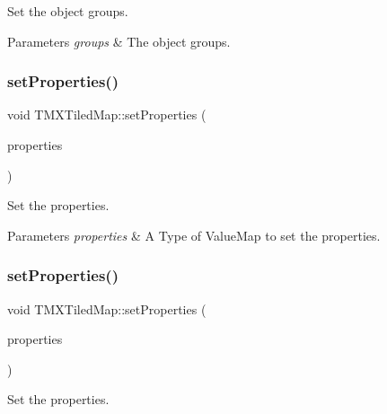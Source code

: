 Set the object groups.


\begin{DoxyParams}{Parameters}
{\em groups} & The object groups. \\
\hline
\end{DoxyParams}
\mbox{\label{classTMXTiledMap_a818366d2f1093dfd8afc24126ffbac36}} 
\subsubsection{\texorpdfstring{set\+Properties()}{setProperties()}\hspace{0.1cm}{\footnotesize\ttfamily [1/2]}}
{\footnotesize\ttfamily void T\+M\+X\+Tiled\+Map\+::set\+Properties (\begin{DoxyParamCaption}\item[{const Value\+Map \&}]{properties }\end{DoxyParamCaption})\hspace{0.3cm}{\ttfamily [inline]}}

Set the properties.


\begin{DoxyParams}{Parameters}
{\em properties} & A Type of Value\+Map to set the properties. \\
\hline
\end{DoxyParams}
\mbox{\label{classTMXTiledMap_a818366d2f1093dfd8afc24126ffbac36}} 
\subsubsection{\texorpdfstring{set\+Properties()}{setProperties()}\hspace{0.1cm}{\footnotesize\ttfamily [2/2]}}
{\footnotesize\ttfamily void T\+M\+X\+Tiled\+Map\+::set\+Properties (\begin{DoxyParamCaption}\item[{const Value\+Map \&}]{properties }\end{DoxyParamCaption})\hspace{0.3cm}{\ttfamily [inline]}}

Set the properties.


